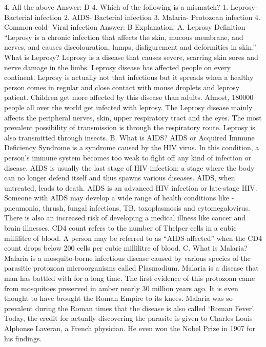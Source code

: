 4. All the above
Answer: D
4. Which of the following is a mismatch?
1. Leprosy- Bacterial infection
2. AIDS- Bacterial infection
3. Malaria- Protozoan infection
4. Common cold- Viral infection
Answer: B
Explanation:
A. Leprosy Definition
“Leprosy is a chronic infection that affects the skin, mucous
membrane, and nerves, and causes discolouration, lumps,
disfigurement and deformities in skin.”
What is Leprosy?
Leprosy is a disease that causes severe, scarring skin sores and
nerve damage in the limbs. Leprosy disease has affected people on
every continent. Leprosy is actually not that infectious but it
spreads when a healthy person comes in regular and close contact
with mouse droplets and leprosy patient. Children get more affected
by this disease than adults. Almost, 180000 people all over the world
get infected with leprosy.
The Leprosy disease mainly affects the peripheral nerves, skin,
upper respiratory tract and the eyes. The most prevalent possibility
of transmission is through the respiratory route. Leprosy is also
transmitted through insects.
B. What is AIDS?
AIDS or Acquired Immune Deficiency Syndrome is a syndrome
caused by the HIV virus. In this condition, a person’s immune system
becomes too weak to fight off any kind of infection or disease.
AIDS is usually the last stage of HIV infection; a stage where the
body can no longer defend itself and thus spawns various diseases.
AIDS, when untreated, leads to death.
AIDS is an advanced HIV infection or late-stage HIV. Someone with
AIDS may develop a wide range of health conditions like -
pneumonia, thrush, fungal infections, TB, toxoplasmosis and
cytomegalovirus.
There is also an increased risk of developing a medical illness like
cancer and brain illnesses. CD4 count refers to the number of Thelper cells in a cubic millilitre of blood. A person may be referred
to as “AIDS-affected” when the CD4 count drops below 200 cells
per cubic millilitre of blood.
C. What is Malaria?
Malaria is a mosquito-borne infectious disease caused by various
species of the parasitic protozoan microorganisms called Plasmodium.
Malaria is a disease that man has battled with for a long time. The
first evidence of this protozoan came from mosquitoes preserved in
amber nearly 30 million years ago.
It is even thought to have brought the Roman Empire to its knees.
Malaria was so prevalent during the Roman times that the disease is
also called ‘Roman Fever’. Today, the credit for actually discovering
the parasite is given to Charles Louis Alphonse Laveran, a French
physician. He even won the Nobel Prize in 1907 for his findings.

